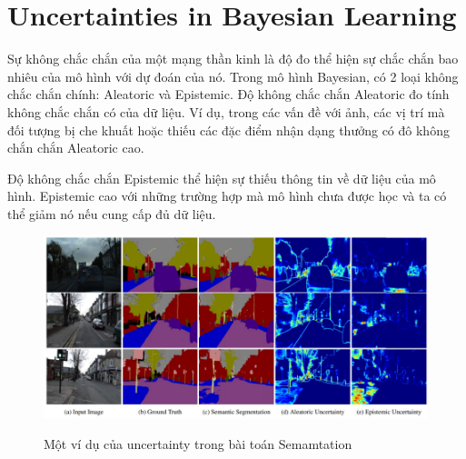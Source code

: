 \section{Uncertainties in Bayesian Learning}

Sự không chắc chắn của một mạng thần kinh là độ đo thể hiện sự chắc chắn bao nhiêu của mô hình với dự đoán của nó. Trong mô hình Bayesian, có 2 loại không chắc chắn chính: Aleatoric và Epistemic.
Độ không chắc chắn Aleatoric đo tính không chắc chắn có của dữ liệu. Ví dụ, trong các vấn đề với ảnh, các vị trí mà đối tượng bị che khuất hoặc thiếu các đặc điểm nhận dạng thưởng có đô không chắn chắn Aleatoric cao.


Độ không chắc chắn Epistemic thể hiện sự thiếu thông tin về dữ liệu của mô hình. Epistemic cao với những trường hợp mà mô hình chưa được học và ta có thể giảm nó nếu cung cấp đủ dữ liệu.

\begin{figure}[h]
	\begin{center}
		\includegraphics[height=.25\textheight]{Chuong3/Figs/uncertainty.png}
		\label{fig:minh hoa uncertainty}
		\caption{Một ví dụ của uncertainty trong bài toán Semamtation}
	\end{center}
\end{figure}




